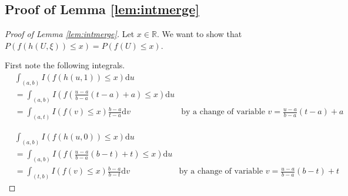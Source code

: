 \documentclass[12pt]{article}
\theoremstyle{plain}%
\theoremstyle{definition}
\def\d{\mathrm{d}}
\begin{document}
\subsection{Proof of Lemma \ref{lem:intmerge}}\label{sec:intmerge}
	\begin{proof}[Proof of Lemma \ref{lem:intmerge}]\label{pf:intmerge}
	Let $x\in \mathbb{R}$. We want to show that $P(f(h(U,\xi))\leq x)=P(f(U)\leq x)$.
	
	First note the following integrals.
	\begin{align}\label{eq:intmerge1}
		&\int_{(a,b)}I(f(h(u,1))\leq x) \d u\\
		&= \int_{(a,b)}I\left(f\left(\frac{u-a}{b-a}(t-a)+a\right)\leq x\right) \d u \\
		&= \int_{(a,t)}I\left(f\left(v\right)\leq x\right) \frac{b-a}{t-a}\d v &\text{by a change of variable $v=\frac{u-a}{b-a}(t-a)+a$}
	\end{align}
	
	\begin{align}\label{eq:intmerge2}
		&\int_{(a,b)}I(f(h(u,0))\leq x) \d u\\
		&= \int_{(a,b)}I\left(f\left(\frac{u-a}{b-a}(b-t)+t\right)\leq x\right) \d u \\
		&= \int_{(t,b)}I\left(f\left(v\right)\leq x\right) \frac{b-a}{b-t}\d v &\text{by a change of variable $v=\frac{u-a}{b-a}(b-t)+t$}
	\end{align}
	

\end{proof}
\end{document}
